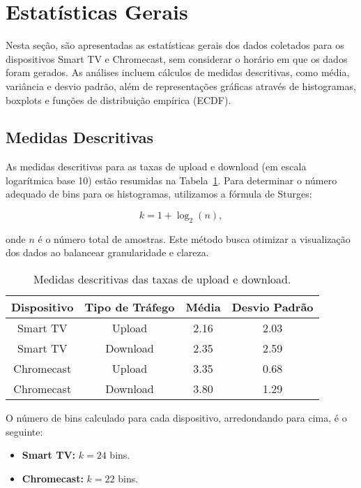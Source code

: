 \section{Estatísticas Gerais}

Nesta seção, são apresentadas as estatísticas gerais dos dados coletados para os dispositivos Smart TV e Chromecast, sem considerar o horário em que os dados foram gerados. As análises incluem cálculos de medidas descritivas, como média, variância e desvio padrão, além de representações gráficas através de histogramas, boxplots e funções de distribuição empírica (ECDF). 

\subsection{Medidas Descritivas}

As medidas descritivas para as taxas de upload e download (em escala logarítmica base 10) estão resumidas na Tabela~\ref{tab:estatisticas}. Para determinar o número adequado de bins para os histogramas, utilizamos a fórmula de Sturges:

\begin{equation}
k = 1 + \log_2(n),
\end{equation}

onde \(n\) é o número total de amostras. Este método busca otimizar a visualização dos dados ao balancear granularidade e clareza.

\begin{table}[H]
\centering
\caption{Medidas descritivas das taxas de upload e download.}
\label{tab:estatisticas}
\begin{tabular}{|c|c|c|c|}
\hline
\textbf{Dispositivo} & \textbf{Tipo de Tráfego} & \textbf{Média} & \textbf{Desvio Padrão} \\ \hline
Smart TV & Upload & 2.16 & 2.03 \\ \hline
Smart TV & Download & 2.35 & 2.59 \\ \hline
Chromecast & Upload & 3.35 & 0.68 \\ \hline
Chromecast & Download & 3.80 & 1.29 \\ \hline
\end{tabular}
\end{table}

O número de bins calculado para cada dispositivo, arredondando para cima, é o seguinte:
\begin{itemize}
    \item \textbf{Smart TV:} \(k = 24\) bins.
    \item \textbf{Chromecast:} \(k = 22\) bins.
\end{itemize}

